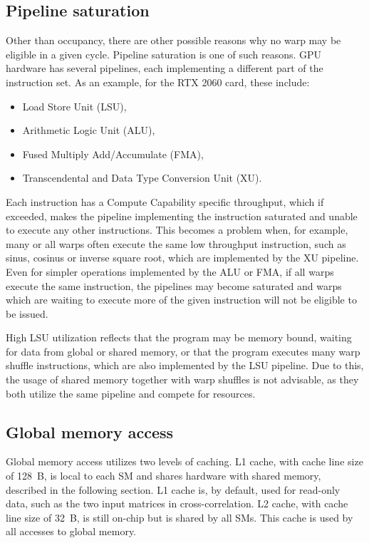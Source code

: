 \subsection{Pipeline saturation}

Other than occupancy, there are other possible reasons why no warp may be eligible in a given cycle. Pipeline saturation is one of such reasons. GPU hardware has several pipelines, each implementing a different part of the instruction set. As an example, for the RTX 2060 card, these include:
\begin{itemize}
	\item Load Store Unit (LSU),
	\item Arithmetic Logic Unit (ALU),
	\item Fused Multiply Add/Accumulate (FMA),
	\item Transcendental and Data Type Conversion Unit (XU).
\end{itemize}

Each instruction has a Compute Capability specific throughput, which if exceeded, makes the pipeline implementing the instruction saturated and unable to execute any other instructions. This becomes a problem when, for example, many or all warps often execute the same low throughput instruction, such as sinus, cosinus or inverse square root, which are implemented by the XU pipeline. Even for simpler operations implemented by the ALU or FMA, if all warps execute the same instruction, the pipelines may become saturated and warps which are waiting to execute more of the given instruction will not be eligible to be issued.

High LSU utilization reflects that the program may be memory bound, waiting for data from global or shared memory, or that the program executes many warp shuffle instructions, which are also implemented by the LSU pipeline. Due to this, the usage of shared memory together with warp shuffles is not advisable, as they both utilize the same pipeline and compete for resources.


\subsection{Global memory access}

Global memory access utilizes two levels of caching. L1 cache, with cache line size of 128~B, is local to each SM and shares hardware with shared memory, described in the following section. L1 cache is, by default, used for read-only data, such as the two input matrices in cross-correlation. 
L2 cache, with cache line size of 32~B, is still on-chip but is shared by all SMs. This cache is used by all accesses to global memory.

